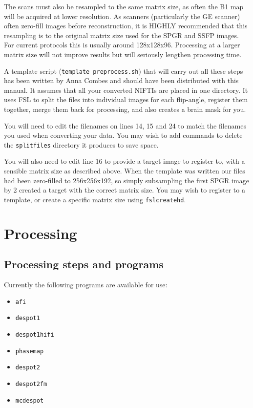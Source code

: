 \documentclass{report}
\begin{document}
The scans must also be resampled to the same matrix size, as often the B1 map will be acquired at lower resolution. As scanners (particularly the GE scanner) often zero-fill images before reconstruction, it is HIGHLY recommended that this resampling is to the original matrix size used for the SPGR and SSFP images. For current protocols this is usually around 128x128x96. Processing at a larger matrix size will not improve results but will seriously lengthen processing time.

A template script (\texttt{template\_preprocess.sh}) that will carry out all these steps has been written by Anna Combes and should have been distributed with this manual. It assumes that all your converted NIFTIs are placed in one directory. It uses FSL to split the files into individual images for each flip-angle, register them together, merge them back for processing, and also creates a brain mask for you.

You will need to edit the filenames on lines 14, 15 and 24 to match the filenames you used when converting your data. You may wish to add commands to delete the \texttt{splitfiles} directory it produces to save space.

You will also need to edit line 16 to provide a target image to register to, with  a sensible matrix size as described above. When the template was written our files had been zero-filled to 256x256x192, so simply subsampling the first SPGR image by 2 created a target with the correct matrix size. You may wish to register to a template, or create a specific matrix size using \texttt{fslcreatehd}.

\chapter{Processing}

\section{Processing steps and programs}

Currently the following programs are available for use:
\begin{itemize} \itemsep1pt \parskip0pt 
  \item \texttt{afi}
  \item \texttt{despot1}
  \item \texttt{despot1hifi}
  \item \texttt{phasemap}
  \item \texttt{despot2}
  \item \texttt{despot2fm}
  \item \texttt{mcdespot}
\end{itemize}
\end{document}
